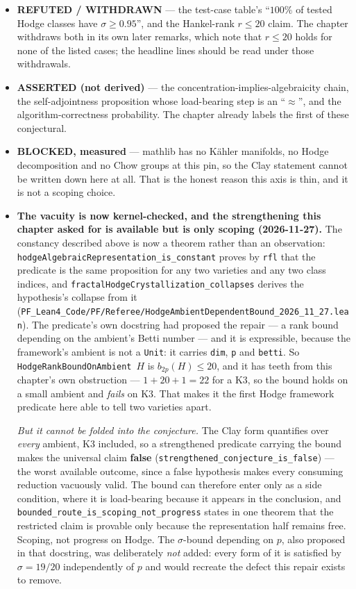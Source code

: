 \begin{itemize}
\item \textbf{REFUTED / WITHDRAWN} --- the test-case table's
``$100\%$ of tested Hodge classes have $\sigma \ge 0.95$'', and the Hankel-rank
$r \le 20$ claim. The chapter withdraws both in its own later remarks, which
note that $r \le 20$ holds for none of the listed cases; the headline lines
should be read under those withdrawals.

\item \textbf{ASSERTED (not derived)} --- the concentration-implies-algebraicity
chain, the self-adjointness proposition whose load-bearing step is an
``$\approx$'', and the algorithm-correctness probability. The chapter already
labels the first of these conjectural.

\item \textbf{BLOCKED, measured} --- mathlib has no K\"ahler manifolds, no
Hodge decomposition and no Chow groups at this pin, so the Clay statement
cannot be written down here at all. That is the honest reason this axis is
thin, and it is not a scoping choice.

\item \textbf{The vacuity is now kernel-checked, and the
strengthening this chapter asked for is available but is only scoping
(2026-11-27).} The constancy described above is now a theorem rather than an
observation: \texttt{hodgeAlgebraicRepresentation\_is\_constant} proves by
\texttt{rfl} that the predicate is the same proposition for any two varieties
and any two class indices, and
\texttt{fractalHodgeCrystallization\_collapses} derives the hypothesis's
collapse from it
(\texttt{PF\_Lean4\_Code/PF/Referee/HodgeAmbientDependentBound\_2026\_11\_27.lean}).
The predicate's own docstring had proposed the repair --- a rank bound
depending on the ambient's Betti number --- and it is expressible, because the
framework's ambient is not a \texttt{Unit}: it carries \texttt{dim},
\texttt{p} and \texttt{betti}. So \texttt{HodgeRankBoundOnAmbient}~$H$ is
$b_{2p}(H) \le 20$, and it has teeth from this chapter's own obstruction ---
$1 + 20 + 1 = 22$ for a K3, so the bound holds on a small ambient and
\emph{fails} on K3. That makes it the first Hodge framework predicate here
able to tell two varieties apart.

  \emph{But it cannot be folded into the conjecture.} The Clay form quantifies
  over \emph{every} ambient, K3 included, so a strengthened predicate carrying
  the bound makes the universal claim \textbf{false}
  (\texttt{strengthened\_conjecture\_is\_false}) --- the worst available
  outcome, since a false hypothesis makes every consuming reduction vacuously
  valid. The bound can therefore enter only as a side condition, where it is
  load-bearing because it appears in the conclusion, and
  \texttt{bounded\_route\_is\_scoping\_not\_progress} states in one theorem
  that the restricted claim is provable only because the representation half
  remains free. Scoping, not progress on Hodge. The $\sigma$-bound depending on
  $p$, also proposed in that docstring, was deliberately \emph{not} added:
  every form of it is satisfied by $\sigma = 19/20$ independently of $p$ and
  would recreate the defect this repair exists to remove.

\end{itemize}

